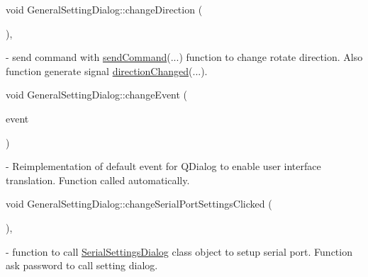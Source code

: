 \mbox{\label{classGeneralSettingDialog_a67274a86c828985ee88c055de4d2bce5}} 
{\footnotesize\ttfamily void General\+Setting\+Dialog\+::\texorpdfstring{change\+Direction}{changeDirection} (\begin{DoxyParamCaption}{ }\end{DoxyParamCaption}){\ttfamily [private]}, {\ttfamily [slot]}} - send command with \hyperlink{classGeneralSettingDialog_aa381596bc44cfcaeb85a8d906b877b86}{send\+Command}(...) function to change rotate direction. Also function generate signal \hyperlink{classGeneralSettingDialog_aa4bc1d43246c829906a530b5a127a417}{direction\+Changed}(...).

\mbox{\label{classGeneralSettingDialog_aecac66d55350cfbe21c6bac6f5476099}} 
{\footnotesize\ttfamily void General\+Setting\+Dialog\+::\texorpdfstring{change\+Event}{changeEvent} (\begin{DoxyParamCaption}\item[{Q\+Event $\ast$}]{event }\end{DoxyParamCaption}){\ttfamily [protected]}} - Reimplementation of default event for QDialog to enable user interface translation. Function called automatically.

\mbox{\label{classGeneralSettingDialog_afd7ce89c9dde6f411472da4e413475ec}} 
{\footnotesize\ttfamily void General\+Setting\+Dialog\+::\texorpdfstring{change\+Serial\+Port\+Settings\+Clicked}{changeSerialPortSettingsClicked} (\begin{DoxyParamCaption}{ }\end{DoxyParamCaption}){\ttfamily [private]}, {\ttfamily [slot]}} - function to call \hyperlink{classSerialSettingsDialog}{Serial\+Settings\+Dialog} class object to setup serial port. Function ask password to call setting dialog.

